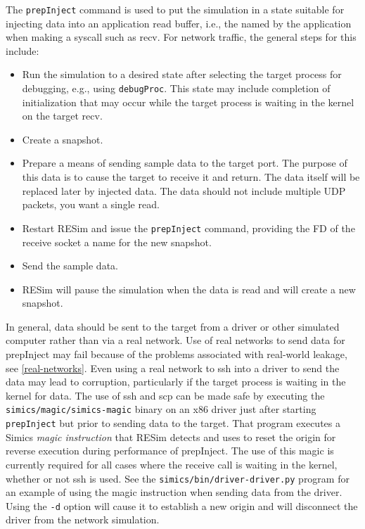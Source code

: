 \documentclass[titlepage]{article}
\begin{document}
The {\tt prepInject} command is used to put the simulation in a state suitable for injecting data into an application
read buffer, i.e., the named by the application when making a syscall such as recv.  For network traffic, the general steps for this include:
\begin{itemize}
\item Run the simulation to a desired state after selecting the target process for debugging, e.g., using {\tt debugProc}.  This state may include
completion of initialization that may occur while the target process is waiting in the kernel on the target recv.
\item Create a snapshot.
\item Prepare a means of sending sample data to the target port.  The purpose of this data is to cause the target to receive it and return.  The
data itself will be replaced later by injected data.  The data should not include multiple UDP packets, you want a single read.
\item Restart RESim and issue the {\tt prepInject} command, providing the FD of the receive socket a name for the new snapshot.
\item Send the sample data.
\item RESim will pause the simulation when the data is read and will create a new snapshot.
\end{itemize}
In general, data should be sent to the target from a driver or other simulated computer rather than via a real network.  Use of real networks to
send data for prepInject may fail because of the problems associated with real-world leakage, see \ref{real-networks}.
Even using a real network to ssh into a driver to send the data may lead to corruption, particularly if the target process is waiting in the 
kernel for data.  The use of ssh and scp can be made safe by executing the {\tt simics/magic/simics-magic} binary on an x86 driver just after
starting {\tt prepInject} but prior to sending data to the target.  That program executes a Simics \textit{magic instruction} that RESim 
detects and uses to reset the origin for reverse execution during performance of prepInject.  The use of this magic is currently required for all
cases where the receive call is waiting in the kernel, whether or not ssh is used.  See the {\tt simics/bin/driver-driver.py} program for an example
of using the magic instruction when sending data from the driver.  Using the {\tt -d} option will cause it to establish a new origin and will disconnect
the driver from the network simulation.
\end{document}
